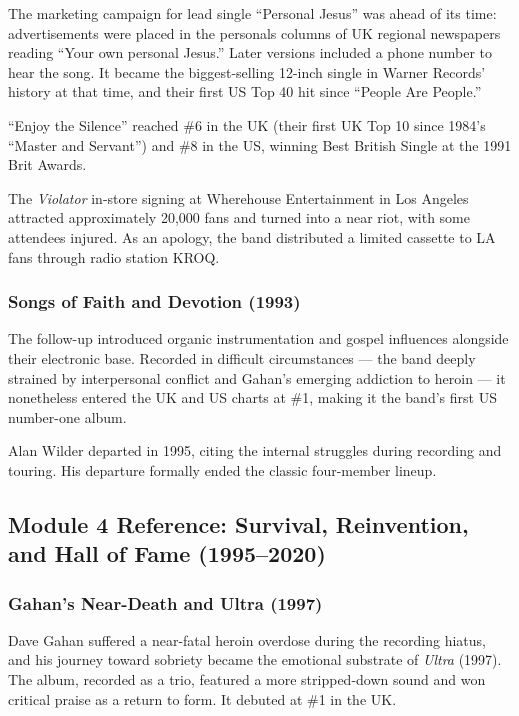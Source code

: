 \documentclass[11pt,letterpaper]{article}
\begin{document}
The marketing campaign for lead single ``Personal Jesus'' was ahead of its time: advertisements were placed in the personals columns of UK regional newspapers reading ``Your own personal Jesus.'' Later versions included a phone number to hear the song. It became the biggest-selling 12-inch single in Warner Records' history at that time, and their first US Top 40 hit since ``People Are People.''

``Enjoy the Silence'' reached \#6 in the UK (their first UK Top 10 since 1984's ``Master and Servant'') and \#8 in the US, winning Best British Single at the 1991 Brit Awards.

The \textit{Violator} in-store signing at Wherehouse Entertainment in Los Angeles attracted approximately 20,000 fans and turned into a near riot, with some attendees injured. As an apology, the band distributed a limited cassette to LA fans through radio station KROQ.

\subsubsection{Songs of Faith and Devotion (1993)}

The follow-up introduced organic instrumentation and gospel influences alongside their electronic base. Recorded in difficult circumstances --- the band deeply strained by interpersonal conflict and Gahan's emerging addiction to heroin --- it nonetheless entered the UK and US charts at \#1, making it the band's first US number-one album.

Alan Wilder departed in 1995, citing the internal struggles during recording and touring. His departure formally ended the classic four-member lineup.

\subsection{Module 4 Reference: Survival, Reinvention, and Hall of Fame (1995--2020)}

\subsubsection{Gahan's Near-Death and Ultra (1997)}

Dave Gahan suffered a near-fatal heroin overdose during the recording hiatus, and his journey toward sobriety became the emotional substrate of \textit{Ultra} (1997). The album, recorded as a trio, featured a more stripped-down sound and won critical praise as a return to form. It debuted at \#1 in the UK.
\end{document}
